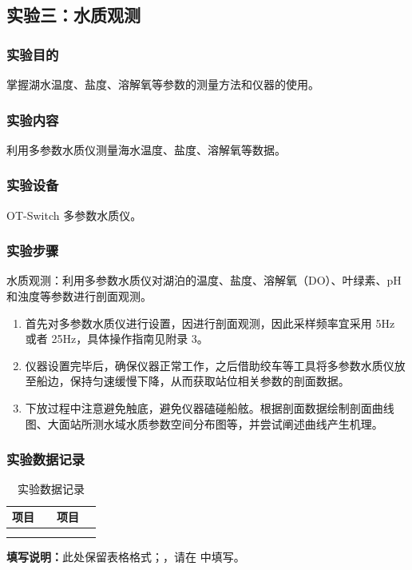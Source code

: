 \documentclass[UTF8,a4paper,12pt]{ctexart}
\begin{document}
\subsection{实验三：水质观测}

\subsubsection{实验目的}
掌握湖水温度、盐度、溶解氧等参数的测量方法和仪器的使用。

\subsubsection{实验内容}
利用多参数水质仪测量海水温度、盐度、溶解氧等数据。

\subsubsection{实验设备}
OT-Switch 多参数水质仪。

\subsubsection{实验步骤}
水质观测：利用多参数水质仪对湖泊的温度、盐度、溶解氧（DO）、叶绿素、pH 和浊度等参数进行剖面观测。

\begin{enumerate}[label=（\arabic*）]
  \item 首先对多参数水质仪进行设置，因进行剖面观测，因此采样频率宜采用 5Hz 或者 25Hz，具体操作指南见附录 3。
  \item 仪器设置完毕后，确保仪器正常工作，之后借助绞车等工具将多参数水质仪放至船边，保持匀速缓慢下降，从而获取站位相关参数的剖面数据。
  \item 下放过程中注意避免触底，避免仪器磕碰船舷。根据剖面数据绘制剖面曲线图、大面站所测水域水质参数空间分布图等，并尝试阐述曲线产生机理。
\end{enumerate}

\subsubsection{实验数据记录}

\begin{table}[H]
\centering
\caption{实验数据记录}
\begin{tabularx}{\linewidth}{YYYY}
\toprule
项目 & {} & 项目 & {} \\
\midrule
{} & {} & {} & {} \\
{} & {} & {} & {} \\
\bottomrule
\end{tabularx}
\end{table}
\noindent\textbf{填写说明：}此处保留表格格式；，请在 {} 中填写。\par
\end{document}
